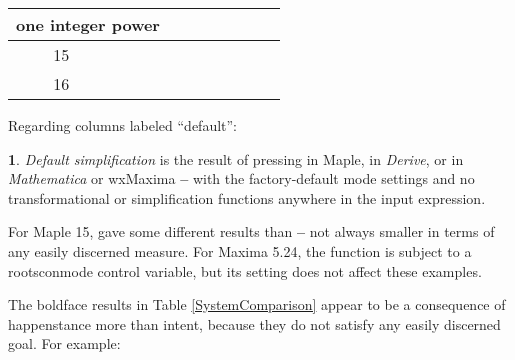 \documentclass[12pt,english]{article}
\providecommand{\tabularnewline}{\\}
\theoremstyle{definition}
\newtheorem*{defn*}{\protect\definitionname}
\theoremstyle{remark}
\theoremstyle{plain}
\theoremstyle{plain}
\providecommand{\definitionname}{Definition}
\begin{document}
\begin{table}[H]
\begin{tabular}{|c|c|c|c|c|c|c|c|c|}
\hline 
\multicolumn{2}{c|}{one integer power} & \multicolumn{7}{c}{}\tabularnewline
\hline 
{\footnotesize \negthinspace{}\negthinspace{}\negthinspace{}}{\scriptsize 15}{\footnotesize \negthinspace{}\negthinspace{}\negthinspace{}} & \rule[-9pt]{0pt}{26pt} & \textsl{\footnotesize \negthinspace{}\negthinspace{}}\textsl{\footnotesize \negthinspace{}\negthinspace{}} & \textsl{\footnotesize \negthinspace{}\negthinspace{}}\textsl{\footnotesize \negthinspace{}\negthinspace{}} &  &  &  &  & \negthinspace{}\negthinspace{}\negthinspace{}\negthinspace{}\tabularnewline
\hline 
{\footnotesize \negthinspace{}\negthinspace{}\negthinspace{}}{\scriptsize 16\negthinspace{}}{\footnotesize \negthinspace{}\negthinspace{}} & \rule[-9pt]{0pt}{26pt} & \textsl{\footnotesize \negthinspace{}\negthinspace{}}\textsl{\footnotesize \negthinspace{}\negthinspace{}} & \textsl{\footnotesize \negthinspace{}\negthinspace{}}\textsl{\footnotesize \negthinspace{}\negthinspace{}} &  &  &  &  & \negthinspace{}\negthinspace{}\negthinspace{}\negthinspace{}\tabularnewline
\hline 
\end{tabular}
\end{table}


Regarding columns labeled ``default'':
\begin{defn*}
\textsl{Default simplification} is the result of pressing 
in Maple,   in \textsl{Derive},
or   in \textsl{Mathematica} or
wxMaxima \textbf{--} with the factory-default mode settings and no
transformational or simplification functions anywhere in the input
expression.
\end{defn*}
For Maple 15,  gave some
different results than  \textbf{--} not
always smaller in terms of any easily discerned measure. For Maxima
5.24, the  function is subject to
a rootsconmode control variable, but its setting does not affect these
examples.

The boldface results in Table \ref{SystemComparison} appear to be
a consequence of happenstance more than intent, because they do not
satisfy any easily discerned goal. For example:\vspace{-0.6em}
\end{document}
